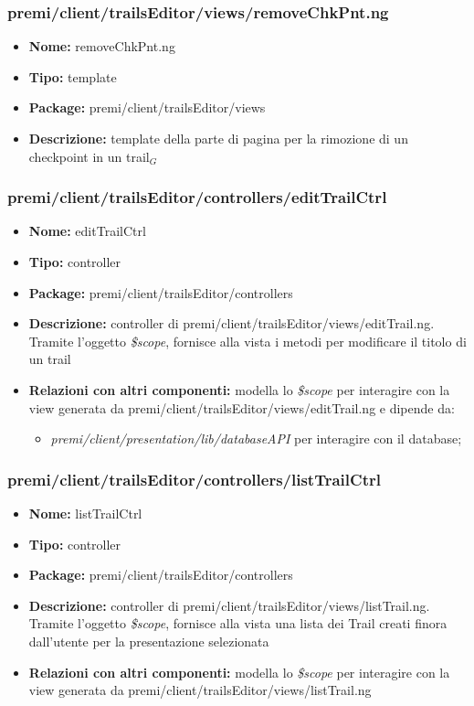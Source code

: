 \subsubsection{premi/client/trailsEditor/views/removeChkPnt.ng}
\begin{itemize}
  \item[] \textbf{Nome:} removeChkPnt.ng
  \item[] \textbf{Tipo:} template
  \item[] \textbf{Package:} premi/client/trailsEditor/views
  \item[] \textbf{Descrizione:}  template della parte di pagina per la rimozione di un checkpoint in un trail$_G$
\end{itemize}
\subsubsection{premi/client/trailsEditor/controllers/editTrailCtrl}
\begin{itemize}
  \item[] \textbf{Nome:} editTrailCtrl
  \item[] \textbf{Tipo:} controller
  \item[] \textbf{Package:} premi/client/trailsEditor/controllers
  \item[] \textbf{Descrizione:} controller di premi/client/trailsEditor/views/editTrail.ng. Tramite l'oggetto \textit{\$scope}, fornisce alla vista i metodi per modificare il titolo di un trail
  \item[] \textbf{Relazioni con altri componenti:} modella lo \textit{\$scope} per interagire con la view generata da premi/client/trailsEditor/views/editTrail.ng e dipende da:   
  \begin{itemize}
  \item[] \textit{premi/client/presentation/lib/databaseAPI} per interagire con il database;    
  \end{itemize}
\end{itemize}
\subsubsection{premi/client/trailsEditor/controllers/listTrailCtrl}
\begin{itemize}
  \item[] \textbf{Nome:} listTrailCtrl
  \item[] \textbf{Tipo:} controller
  \item[] \textbf{Package:} premi/client/trailsEditor/controllers
  \item[] \textbf{Descrizione:} controller di premi/client/trailsEditor/views/listTrail.ng. Tramite l'oggetto \textit{\$scope}, fornisce alla vista una lista dei Trail creati finora dall'utente per la presentazione selezionata
  \item[] \textbf{Relazioni con altri componenti:} modella lo \textit{\$scope} per interagire con la view generata da premi/client/trailsEditor/views/listTrail.ng
\end{itemize}
